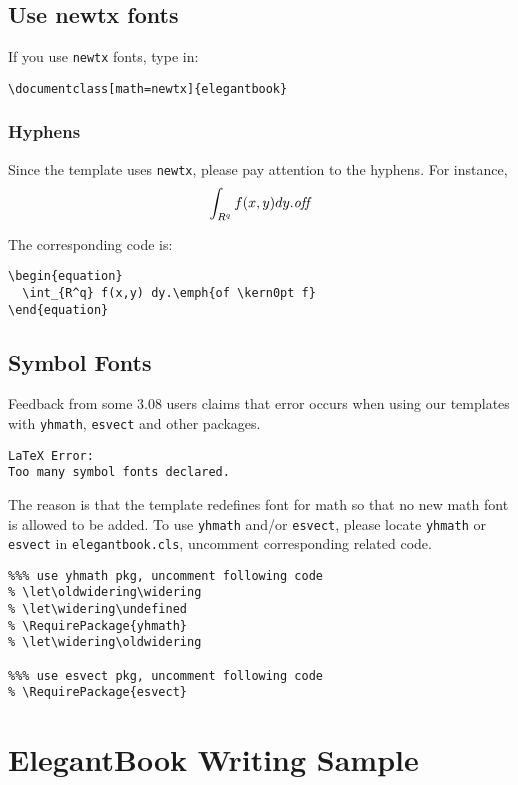 \documentclass[11pt,fancy,twocol,twoside]{elegantbook}
\begin{document}
\section{Use newtx fonts}
If you use \lstinline{newtx} fonts, type in:

\begin{lstlisting}
\documentclass[math=newtx]{elegantbook}
\end{lstlisting}


\subsection{Hyphens}
Since the template uses \lstinline{newtx}, please pay attention to the hyphens. For instance,
\begin{equation}
\int_{R^q} f(x,y) dy.\emph{of\kern0pt f}
\end{equation}

The corresponding code is: 
\begin{lstlisting}
\begin{equation}
  \int_{R^q} f(x,y) dy.\emph{of \kern0pt f}
\end{equation}
\end{lstlisting}

\section{Symbol Fonts}
Feedback from some 3.08 users claims that error occurs when using our templates with  \lstinline{yhmath}, \lstinline{esvect} and other packages.
\begin{lstlisting}
LaTeX Error:
Too many symbol fonts declared.
\end{lstlisting}

The reason is that the template redefines font for math so that no new math font is allowed to be added. To use \lstinline{yhmath} and/or \lstinline{esvect}, please locate \lstinline{yhmath} or \lstinline{esvect} in \lstinline{elegantbook.cls}, uncomment corresponding related code.

\begin{lstlisting}
%%% use yhmath pkg, uncomment following code
% \let\oldwidering\widering
% \let\widering\undefined
% \RequirePackage{yhmath}
% \let\widering\oldwidering

%%% use esvect pkg, uncomment following code
% \RequirePackage{esvect}
\end{lstlisting}


\chapter{ElegantBook Writing Sample}
\end{document}
